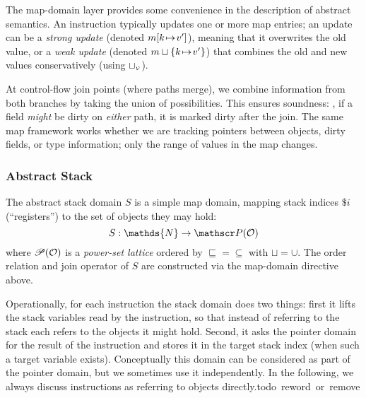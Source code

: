The map-domain layer provides some convenience in the description of abstract semantics.
An instruction typically updates one or more map entries;
an update can be a \emph{strong update} (denoted $m[k{\hspace{1pt}\mapsto\hspace{1pt}} v']$), meaning that it overwrites the old value,
or a \emph{weak update} (denoted $m\sqcup \{k{\hspace{1pt}\mapsto\hspace{1pt}} v'\}$) that
combines the old and new values conservatively (using $\sqcup_{\scriptscriptstyle\mathcal{V}}$).

At control-flow join points (where paths merge), we combine information from both branches by taking the union of possibilities. This ensures soundness: \eg, if a field \emph{might} be dirty on \emph{either} path, it is marked dirty after the join. The same map framework works whether we are tracking pointers between objects, dirty fields, or type information; only the range of values in the map changes.

\subsubsection*{Abstract Stack} The abstract stack domain $S$ is a simple map domain, mapping stack indices $\$i$ (``registers'') to the set of objects they may hold:
\[S : \mathds{N} \to \powerset(\mathcal{O})\]
%
where $\mathscr{P}(\mathcal{O})$ is a \emph{power-set lattice} ordered by ${\sqsubseteq}={\subseteq}$ with ${\sqcup}={\cup}$.
The order relation and join operator of $S$ are constructed via the map-domain
directive above.

Operationally, for each instruction the stack domain does two things: first it lifts the stack variables read by the instruction, so that instead of referring to the stack each refers to the objects it might hold. Second, it asks the pointer domain for the result of the instruction and stores it in the target stack index (when such a target variable exists). Conceptually this domain can be considered as part of the pointer domain, but we sometimes use it independently. In the following, we always discuss instructions as referring to objects directly.\si{todo reword or remove}

